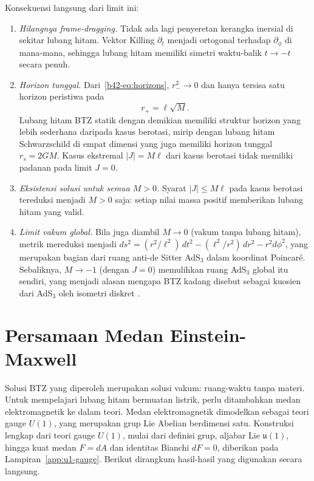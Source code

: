 \noindent Konsekuensi langsung dari limit ini:
\begin{enumerate}[label=\roman*.]
    \item \textit{Hilangnya frame-dragging.} Tidak ada lagi penyeretan kerangka inersial di sekitar lubang hitam. Vektor Killing $\partial_t$ menjadi ortogonal terhadap $\partial_\phi$ di mana-mana, sehingga lubang hitam memiliki simetri waktu-balik $t \to -t$ secara penuh.
    \item \textit{Horizon tunggal.} Dari~\eqref{b42-eq:horizons}, $r_-^2 \to 0$ dan hanya tersisa satu horizon peristiwa pada
    \begin{equation}\label{b42-eq:horizon-J0}
        r_+ = \ell\sqrt{M}.
    \end{equation}
    Lubang hitam BTZ statik dengan demikian memiliki struktur horizon yang lebih sederhana daripada kasus berotasi, mirip dengan lubang hitam Schwarzschild di empat dimensi yang juga memiliki horizon tunggal $r_s = 2GM$. Kasus ekstremal $|J| = M\ell$ dari kasus berotasi tidak memiliki padanan pada limit $J=0$.
    \item \textit{Eksistensi solusi untuk semua $M > 0$.} Syarat $|J| \leq M\ell$ pada kasus berotasi tereduksi menjadi $M > 0$ saja: setiap nilai massa positif memberikan lubang hitam yang valid.
    \item \textit{Limit vakum global.} Bila juga diambil $M \to 0$ (vakum tanpa lubang hitam), metrik mereduksi menjadi $ds^2 = (r^2/\ell^2)\,dt^2 - (\ell^2/r^2)\,dr^2 - r^2 d\phi^2$, yang merupakan bagian dari ruang anti-de Sitter AdS$_3$ dalam koordinat Poincar\'e. Sebaliknya, $M \to -1$ (dengan $J = 0$) memulihkan ruang AdS$_3$ global itu sendiri, yang menjadi alasan mengapa BTZ kadang disebut sebagai kuosien dari AdS$_3$ oleh isometri diskret \cite{banados1993, carlip1995btz}.
\end{enumerate}


\section{Persamaan Medan Einstein-Maxwell}
\label{sec:b4-em-form}

Solusi BTZ yang diperoleh merupakan solusi vakum: ruang-waktu tanpa materi. Untuk mempelajari lubang hitam bermuatan listrik, perlu ditambahkan medan elektromagnetik ke dalam teori. Medan elektromagnetik dimodelkan sebagai teori gauge $U(1)$, yang merupakan grup Lie Abelian berdimensi satu. Konstruksi lengkap dari teori gauge $U(1)$, mulai dari definisi grup, aljabar Lie $\mathfrak{u}(1)$, hingga kuat medan $F = dA$ dan identitas Bianchi $dF = 0$, diberikan pada Lampiran~\ref{app:u1-gauge}. Berikut dirangkum hasil-hasil yang digunakan secara langsung.

